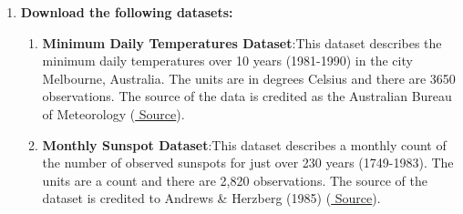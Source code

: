\documentclass[12pt]{article}
\begin{document}



\pagebreak

\begin{enumerate}

\item \textbf{Download the following datasets:}
\begin{enumerate}
\item \textbf{Minimum Daily Temperatures Dataset}:This dataset describes the minimum daily temperatures over 10 years (1981-1990) in the city Melbourne, Australia. The units are in degrees Celsius and there are 3650 observations. The source of the data is credited as the Australian Bureau of Meteorology  (\href{https://raw.githubusercontent.com/jbrownlee/Datasets/master/daily-min-temperatures.csv}{ Source}).
\item \textbf{Monthly Sunspot Dataset}:This dataset describes a monthly count of the number of observed sunspots for just over 230 years (1749-1983). The units are a count and there are 2,820 observations. The source of the dataset is credited to Andrews \& Herzberg (1985) (\href{https://raw.githubusercontent.com/jbrownlee/Datasets/master/monthly-sunspots.csv}{ Source}).
\end{enumerate}

\newpage

\newpage

\newpage

\newpage










\end{enumerate}
\end{document}
